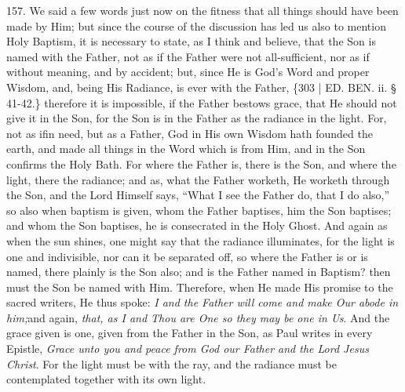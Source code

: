 157. We said a few words just
now on the fitness that all things should have been made by Him; but
since the course of the discussion has led us also to mention Holy
Baptism, it is necessary to state, as I think and believe, that the
Son is named with the Father, not as if the Father were not
all-sufficient, nor as if without meaning, and by accident; but, since
He is God's Word and proper Wisdom, and, being His Radiance, is ever
with the Father, \{303 | ED. BEN.
ii. § 41-42.\} therefore it is impossible, if the Father bestows grace,
that He should not give it in the Son, for the Son is in the Father as
the radiance in the light. For, not as if\emph{}in need, but as a
Father, God in His own Wisdom hath founded the earth, and made all
things in the Word which is from Him, and in the Son confirms the Holy
Bath. For where the Father is, there is the Son, and where the light,
there the radiance; and as, what the Father worketh, He worketh
through the Son, and the Lord Himself says, ``What I see the Father do,
that I do also,'' so also when baptism is given, whom the Father
baptises, him the Son baptises; and whom the Son baptises, he is
consecrated in the Holy Ghost. And again as when the sun shines, one
might say that the radiance illuminates, for the light is one and
indivisible, nor can it be separated off, so where the Father is or is
named, there plainly is the Son also; and is the Father named in
Baptism? then must the Son be named with Him. Therefore, when He made
His promise to the sacred writers, He thus spoke: \emph{I and the Father
will come and make Our abode in him;}and again, \emph{that, as I and
Thou are One so they may be one in Us}. And the grace given is one,
given from the Father in the Son, as Paul writes in every Epistle, \emph{Grace
unto you and peace from God our Father and the Lord Jesus Christ}.
For the light must be with the ray, and the radiance must be
contemplated together with its own light.

